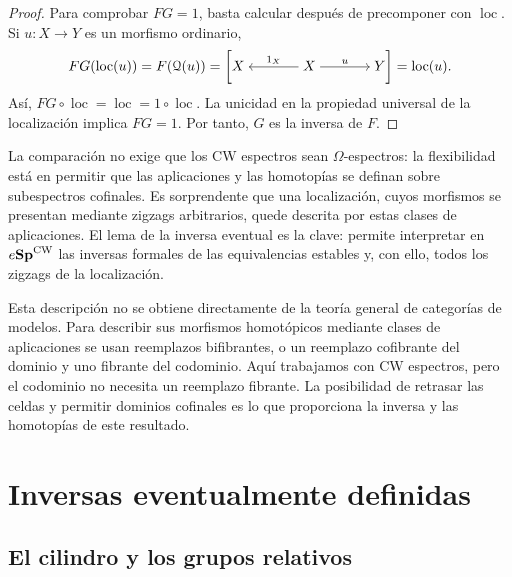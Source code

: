 \begin{proof}
Para comprobar $FG=1$, basta calcular después de precomponer con $\operatorname{loc}$. Si $u\colon X\to Y$ es un morfismo ordinario,
\[
FG(\operatorname{loc}(u))=F(\mathcal Q(u))
=\left[\begin{tikzcd}[cramped,column sep=large]
X & X \arrow[l,"1_X"'] \arrow[r,"u"] & Y
\end{tikzcd}\right]
=\operatorname{loc}(u).
\]
Así, $FG\circ\operatorname{loc}=\operatorname{loc}=1\circ\operatorname{loc}$. La unicidad en la propiedad universal de la localización implica $FG=1$. Por tanto, $G$ es la inversa de $F$.
\end{proof}

La comparación no exige que los CW espectros sean $\Omega$-espectros: la flexibilidad está en permitir que las aplicaciones y las homotopías se definan sobre subespectros cofinales. Es sorprendente que una localización, cuyos morfismos se presentan mediante zigzags arbitrarios, quede descrita por estas clases de aplicaciones. El lema de la inversa eventual es la clave: permite interpretar en $e\mathbf{Sp}^{\mathrm{CW}}$ las inversas formales de las equivalencias estables y, con ello, todos los zigzags de la localización.

\begin{nota}
Esta descripción no se obtiene directamente de la teoría general de categorías de modelos. Para describir sus morfismos homotópicos mediante clases de aplicaciones se usan reemplazos bifibrantes, o un reemplazo cofibrante del dominio y uno fibrante del codominio. Aquí trabajamos con CW espectros, pero el codominio no necesita un reemplazo fibrante. La posibilidad de retrasar las celdas y permitir dominios cofinales es lo que proporciona la inversa y las homotopías de este resultado.
\end{nota}

\section{Inversas eventualmente definidas}

\subsection{El cilindro y los grupos relativos}

